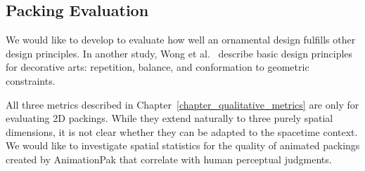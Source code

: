 \subsection{Packing Evaluation}

We would like to develop  to evaluate
how well an ornamental design fulfills other design principles.
In another study, Wong et al.~\cite{Wong1998} describe basic design
principles for decorative arts: repetition, balance, and conformation
to geometric constraints. 


All three metrics described in Chapter~\ref{chapter_qualitative_metrics} are only for evaluating 2D packings.
While they extend naturally to three purely spatial dimensions, 
it is not clear whether they can be adapted to the spacetime context.  
We would like to investigate spatial statistics for the quality of animated packings created by AnimationPak that correlate
with human perceptual judgments.

